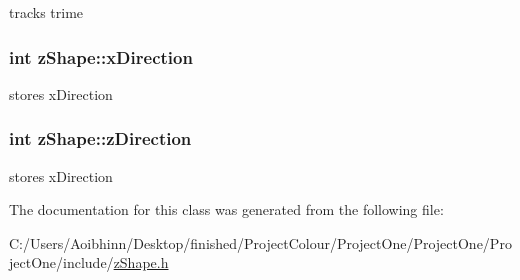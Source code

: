 tracks trime \hypertarget{classz_shape_ab05ebfad3001a2ff2747f7e788efaf06}{
\subsubsection[{x\-Direction}]{\setlength{\rightskip}{0pt plus 5cm}int z\-Shape\-::x\-Direction}}\label{classz_shape_ab05ebfad3001a2ff2747f7e788efaf06}
stores x\-Direction \hypertarget{classz_shape_a4ec37982be7b7b02dbb92135629218f2}{
\subsubsection[{z\-Direction}]{\setlength{\rightskip}{0pt plus 5cm}int z\-Shape\-::z\-Direction}}\label{classz_shape_a4ec37982be7b7b02dbb92135629218f2}
stores x\-Direction 

The documentation for this class was generated from the following file\-:\begin{DoxyCompactItemize}
\item 
C\-:/\-Users/\-Aoibhinn/\-Desktop/finished/\-Project\-Colour/\-Project\-One/\-Project\-One/\-Project\-One/include/\hyperlink{z_shape_8h}{z\-Shape.\-h}\end{DoxyCompactItemize}
